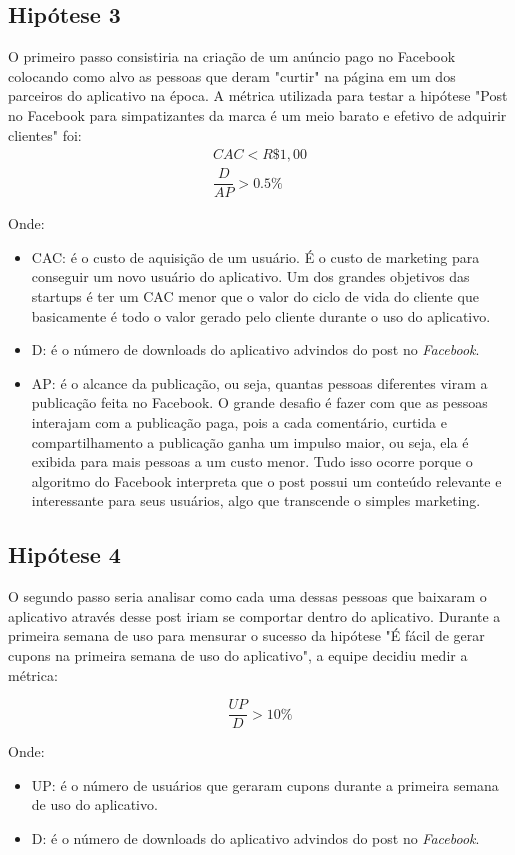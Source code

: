 \subsection{Hipótese 3}
\label{cha:hip_3}
O primeiro passo consistiria na criação de um anúncio pago no Facebook colocando como alvo as pessoas que deram "curtir" na página em um dos parceiros do aplicativo na época. A métrica utilizada para testar a hipótese "Post no Facebook para simpatizantes da marca é um meio barato e efetivo de adquirir clientes" foi:
\begin{align*} 
CAC < R\$1,00 \\
\dfrac{D}{AP} > 0.5\%
\end{align*}

Onde: 
\begin{itemize}
\item CAC: é o custo de aquisição de um usuário. É o custo de marketing para conseguir um novo usuário do aplicativo. Um dos grandes objetivos das startups é ter um CAC menor que o valor do ciclo de vida do cliente que basicamente é todo o valor gerado pelo cliente durante o uso do aplicativo.
\item D: é o número de downloads do aplicativo advindos do post no \textit{Facebook}.
\item AP: é o alcance da publicação, ou seja, quantas pessoas diferentes viram a publicação feita no Facebook. O grande desafio é fazer com que as pessoas interajam com a publicação paga, pois a cada comentário, curtida e compartilhamento a publicação ganha um impulso maior, ou seja, ela é exibida para mais pessoas a um custo menor. Tudo isso ocorre porque o algoritmo do Facebook interpreta que o post possui um conteúdo relevante e interessante para seus usuários, algo que transcende o simples marketing.
\end{itemize}

\subsection{Hipótese 4}
\label{cha:hip_4}
O segundo passo seria analisar como cada uma dessas pessoas que baixaram o aplicativo através desse post iriam se comportar dentro do aplicativo. Durante a primeira semana de uso para mensurar o sucesso da hipótese "É fácil de gerar cupons na primeira semana de uso do aplicativo", a equipe decidiu medir a métrica:

\[\dfrac{UP}{D} > 10\%\]

Onde: 
\begin{itemize}
\item UP: é o número de usuários que geraram cupons durante a primeira semana de uso do aplicativo.
\item D: é o número de downloads do aplicativo advindos do post no \textit{Facebook}.
\end{itemize}


